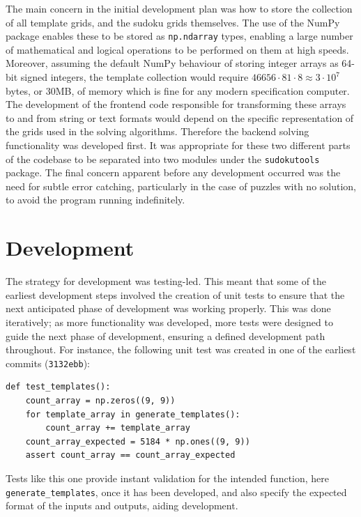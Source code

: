\documentclass[12pt]{article}
\begin{document}
The main concern in the initial development plan was how to store the collection of all template grids, and the sudoku grids themselves.
The use of the NumPy package enables these to be stored as \texttt{np.ndarray} types, enabling a large number of mathematical and logical operations to be performed on them at high speeds.
Moreover, assuming the default NumPy behaviour of storing integer arrays as 64-bit signed integers\cite{numpy}, the template collection would require $46656\cdot81\cdot8\approx3\cdot10^7$ bytes, or 30MB, of memory which is fine for any modern specification computer.
The development of the frontend code responsible for transforming these arrays to and from string or text formats would depend on the specific representation of the grids used in the solving algorithms.
Therefore the backend solving functionality was developed first.
It was appropriate for these two different parts of the codebase to be separated into two modules under the \texttt{sudokutools} package.
The final concern apparent before any development occurred was the need for subtle error catching, particularly in the case of puzzles with no solution, to avoid the program running indefinitely.

\section{Development}
The strategy for development was testing-led.
This meant that some of the earliest development steps involved the creation of unit tests to ensure that the next anticipated phase of development was working properly.
This was done iteratively; as more functionality was developed, more tests were designed to guide the next phase of development, ensuring a defined development path throughout.
For instance, the following unit test was created in one of the earliest commits (\texttt{3132ebb}):

\begin{lstlisting}
def test_templates():
    count_array = np.zeros((9, 9))
    for template_array in generate_templates():
        count_array += template_array
    count_array_expected = 5184 * np.ones((9, 9))
    assert count_array == count_array_expected
\end{lstlisting}

Tests like this one provide instant validation for the intended function, here \texttt{generate\_templates}, once it has been developed, and also specify the expected format of the inputs and outputs, aiding development.
\end{document}
